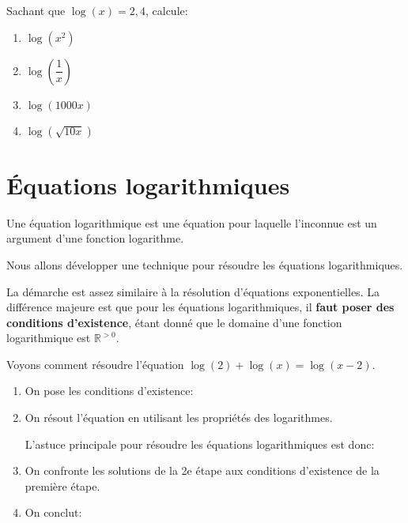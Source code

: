 \documentclass[a4paper,12pt,singlepage]{report}
\newcommand{\IR}{\mathbb{R}}
\begin{document}
\begin{exercice}
Sachant que \(\log(x)=2,4\), calcule:
\par \setlength{\columnseprule}{0 pt}
          \begin{minipage}[t]{\linewidth}
          \begin{multicols}{2}
\begin{enumerate}
\item \(\log(x^2)\)
\item \(\log\left(\dfrac{1}{x}\right)\)
\item \(\log(1000x)\)
\item \(\log(\sqrt{10x})\)
\end{enumerate}


\end{multicols}\end{minipage}
\end{exercice}

\section{Équations logarithmiques}
\label{sec:org15f7913}

Une équation logarithmique est une équation pour laquelle l'inconnue est un
argument d'une fonction logarithme.

Nous allons développer une technique pour résoudre les équations logarithmiques.

La démarche est assez similaire à la résolution d'équations exponentielles. La
différence majeure est que pour les équations logarithmiques, il \textbf{faut poser des
conditions d'existence}, étant donné que le domaine d'une fonction logarithmique
est \(\IR^{>0}\).

Voyons comment résoudre l'équation \(\log(2)+\log(x)=\log(x-2)\).

\begin{enumerate}
\item On pose les conditions d'existence:
\vspace{3cm}
\item On résout l'équation en utilisant les propriétés des logarithmes.
\vspace{4cm}

L'astuce principale pour résoudre les équations logarithmiques est donc:
\vspace{2cm}
\item On confronte les solutions de la 2e étape aux conditions d'existence de la
première étape.
\vspace{2cm}
\item On conclut:
\end{enumerate}
\end{document}
